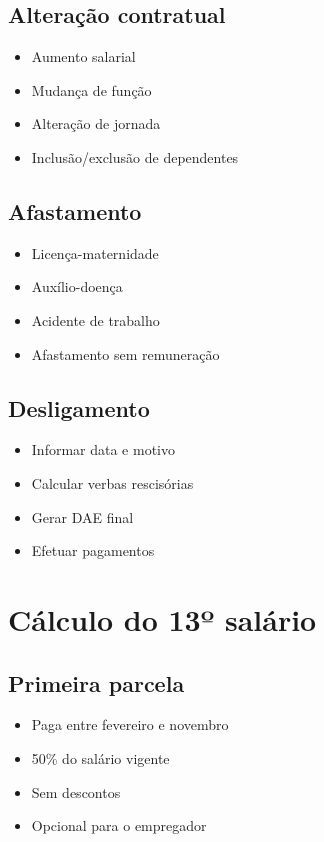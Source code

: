 \documentclass[12pt,a4paper]{article}
\begin{document}
\subsection{Alteração contratual}
\begin{itemize}
    \item Aumento salarial
    \item Mudança de função
    \item Alteração de jornada
    \item Inclusão/exclusão de dependentes
\end{itemize}

\subsection{Afastamento}
\begin{itemize}
    \item Licença-maternidade
    \item Auxílio-doença
    \item Acidente de trabalho
    \item Afastamento sem remuneração
\end{itemize}

\subsection{Desligamento}
\begin{itemize}
    \item Informar data e motivo
    \item Calcular verbas rescisórias
    \item Gerar DAE final
    \item Efetuar pagamentos
\end{itemize}

\section{Cálculo do 13º salário}

\subsection{Primeira parcela}
\begin{itemize}
    \item Paga entre fevereiro e novembro
    \item 50\% do salário vigente
    \item Sem descontos
    \item Opcional para o empregador
\end{itemize}
\end{document}

